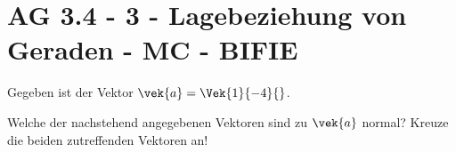 \section{AG 3.4 - 3 - Lagebeziehung von Geraden - MC - BIFIE}

\begin{beispiel}[AG 3.4]{1} %
Gegeben ist der Vektor $\vek{a}=\Vek{1}{-4}{}$.

Welche der nachstehend angegebenen Vektoren sind zu $\vek{a}$ normal?
Kreuze die beiden zutreffenden Vektoren an!
\end{beispiel}